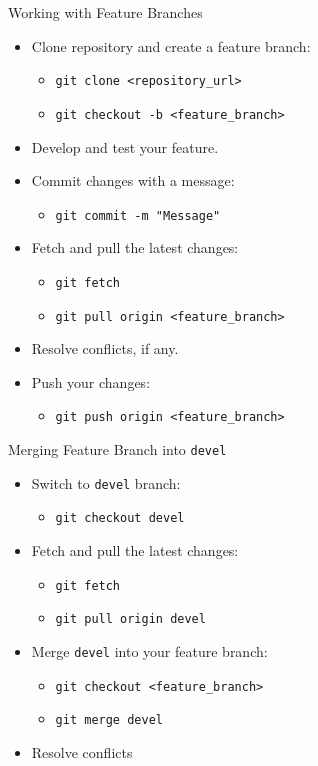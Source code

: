 \begin{frame}{Working with Feature Branches}
  \begin{itemize}
    \item Clone repository and create a feature branch:
      \begin{itemize}
        \item \texttt{git clone <repository\_url>}
        \item \texttt{git checkout -b <feature\_branch>}
      \end{itemize}
    \item Develop and test your feature.
    \item Commit changes with a message:
      \begin{itemize}
        \item \texttt{git commit -m "Message"}
      \end{itemize}
    \item Fetch and pull the latest changes:
      \begin{itemize}
        \item \texttt{git fetch}
        \item \texttt{git pull origin <feature\_branch>}
      \end{itemize}
    \item Resolve conflicts, if any.
    \item Push your changes:
      \begin{itemize}
        \item \texttt{git push origin <feature\_branch>}
      \end{itemize}
  \end{itemize}
\end{frame}

\begin{frame}{Merging Feature Branch into \texttt{devel}}
  \begin{itemize}
    \item Switch to \texttt{devel} branch:
      \begin{itemize}
        \item \texttt{git checkout devel}
      \end{itemize}
    \item Fetch and pull the latest changes:
      \begin{itemize}
        \item \texttt{git fetch}
        \item \texttt{git pull origin devel}
      \end{itemize}
    \item Merge \texttt{devel} into your feature branch:
      \begin{itemize}
        \item \texttt{git checkout <feature\_branch>}
        \item \texttt{git merge devel}
      \end{itemize}
    \item Resolve conflicts
   \end{itemize}
\end{frame}
 
